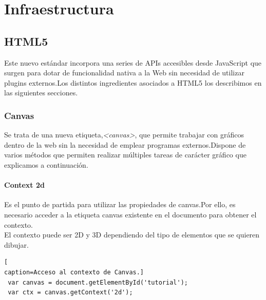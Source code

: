 \chapter{Infraestructura}
\section{HTML5}
Este nuevo estándar incorpora una series de APIs accesibles desde JavaScript que surgen para dotar de funcionalidad nativa a la Web sin necesidad de utilizar plugins externos.Los distintos ingredientes asociados a HTML5\cite{html5} los describimos en las siguientes secciones.
\subsection{Canvas}
Se trata de una nueva etiqueta,\textit{<canvas>}\cite{canvas}, que permite trabajar con gráficos dentro de la web sin la necesidad de emplear programas externos.Dispone de varios métodos que permiten realizar múltiples tareas de carácter gráfico que explicamos a continuación.
\subsubsection*{Context 2d}
Es el punto de partida para utilizar las propiedades de canvas.Por ello, es necesario acceder a la etiqueta canvas existente en el documento para obtener el contexto.
\\El contexto puede ser 2D y 3D dependiendo del tipo de elementos que se quieren dibujar.
\begin{lstlisting}[
caption=Acceso al contexto de Canvas.]
 var canvas = document.getElementById('tutorial');
 var ctx = canvas.getContext('2d');
\end{lstlisting}
